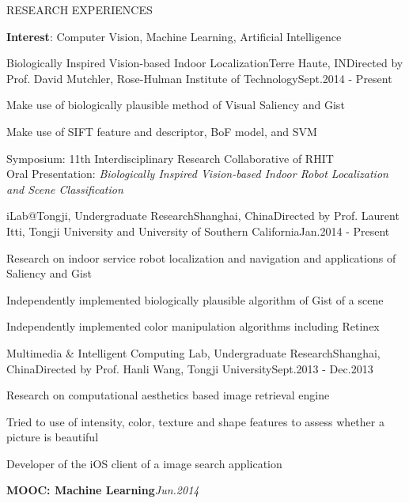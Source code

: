 \documentclass{resume} %
\begin{document}
\begin{rSection}{RESEARCH EXPERIENCES}

  {\bf Interest}: Computer Vision, Machine Learning, Artificial Intelligence \vspace{0.5em}

  \begin{rSubsection}{Biologically Inspired Vision-based Indoor Localization}{Terre Haute, IN}{Directed by Prof. David
    Mutchler, Rose-Hulman Institute of Technology}{Sept.2014 - Present}
  \item Make use of biologically plausible method of Visual Saliency and Gist
  \item Make use of SIFT feature and descriptor, BoF model, and SVM
  \item Symposium: 11th Interdisciplinary Research Collaborative of RHIT \\
    \hspace{\labelwidth}Oral Presentation: {\em Biologically Inspired Vision-based Indoor Robot Localization and Scene Classification}
  \end{rSubsection}


  \begin{rSubsection}{iLab@Tongji, Undergraduate Research}{Shanghai, China}{Directed by Prof. Laurent Itti, Tongji
    University and University of Southern California}{Jan.2014 - Present}
  \item Research on indoor service robot localization and navigation and applications of Saliency and Gist
  \item Independently implemented biologically plausible algorithm of Gist of a scene
  \item Independently implemented color manipulation algorithms including Retinex
  \end{rSubsection}


  \begin{rSubsection}{Multimedia \& Intelligent Computing Lab, Undergraduate Research}{Shanghai, China}{Directed by Prof. Hanli Wang, Tongji
    University}{Sept.2013 - Dec.2013}
  \item Research on computational aesthetics based image retrieval engine
  \item Tried to use of intensity, color, texture and shape features to assess whether a picture is beautiful
  \item Developer of the iOS client of a image search application
  \end{rSubsection}

  {\bf MOOC: Machine Learning}\hfill{\em Jun.2014}

\end{rSection}
\end{document}

